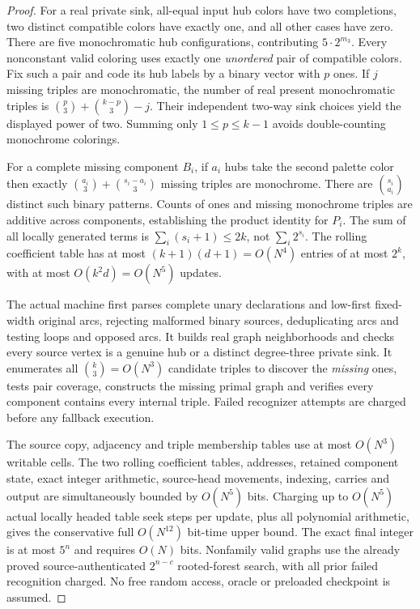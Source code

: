 \documentclass[11pt]{article}
\begin{document}
\begin{proof}
For a real private sink, all-equal input hub colors
have two completions, two distinct compatible colors
have exactly one, and all other cases have zero.
There are five monochromatic hub configurations,
contributing $5\cdot2^{m_3}$. Every nonconstant
valid coloring uses exactly one \emph{unordered} pair
of compatible colors. Fix such a pair and code its
hub labels by a binary vector with $p$ ones.
If $j$ missing triples are monochromatic, the number
of real present monochromatic triples is
$\binom p3+\binom{k-p}3-j$. Their independent two-way
sink choices yield the displayed power of two.
Summing only $1\le p\le k-1$ avoids double-counting
monochrome colorings.

For a complete missing component $B_i$, if $a_i$
hubs take the second palette color then exactly
$\binom{a_i}3+\binom{s_i-a_i}3$
missing triples are monochrome. There are
$\binom{s_i}{a_i}$ distinct such binary patterns.
Counts of ones and missing monochrome triples are
additive across components, establishing the product
identity for $P_i$. The sum of all locally generated
terms is $\sum_i(s_i+1)\le2k$, not
$\sum_i2^{s_i}$. The rolling coefficient table has
at most $(k+1)(d+1)=O(N^4)$ entries of at most
$2^k$, with at most $O(k^2d)=O(N^5)$ updates.

The actual machine first parses complete unary declarations
and low-first fixed-width original arcs, rejecting malformed
binary sources, deduplicating arcs and testing loops and
opposed arcs. It builds real graph neighborhoods and
checks every source vertex is a genuine hub or a distinct
degree-three private sink. It enumerates all
$\binom k3=O(N^3)$ candidate triples to discover the
\emph{missing} ones, tests pair coverage, constructs the
missing primal graph and verifies every component contains
every internal triple. Failed recognizer attempts are
charged before any fallback execution.

The source copy, adjacency and triple membership tables
use at most $O(N^3)$ writable cells. The two rolling
coefficient tables, addresses, retained component state,
exact integer arithmetic, source-head movements, indexing,
carries and output are simultaneously bounded by
$O(N^5)$ bits. Charging up to $O(N^5)$ actual locally
headed table seek steps per update, plus all polynomial
arithmetic, gives the conservative full $O(N^{12})$
bit-time upper bound. The exact final integer is at most
$5^n$ and requires $O(N)$ bits. Nonfamily valid graphs
use the already proved source-authenticated
$2^{n-c}$ rooted-forest search, with all prior failed
recognition charged. No free random access, oracle or
preloaded checkpoint is assumed.
\end{proof}
\end{document}
